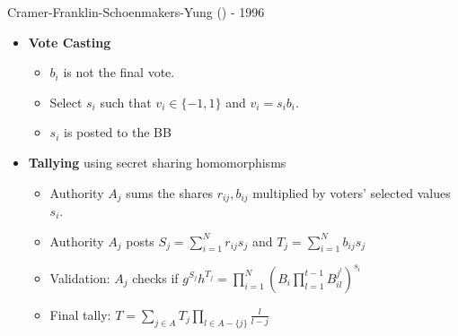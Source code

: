 \documentclass{beamer}
\begin{document}
\begin{frame}[allowframebreaks]{Cramer-Franklin-Schoenmakers-Yung (\cite{CFSY96}) - 1996}
\begin{itemize}
\begin{itemize}
	\framebreak 
	\item Shares $r_i, b_i$ by computing $t-1$ degree polynomials $G_i(x), H_i(x)$ and commits to the 				  			  coefficients  $\{ B_{il} = g^{r_{il}}h^{b_{il}} \}_{l=1}^{t-1}$
	\item The voter posts ($B_i$, validity proof, coefficient commitments) to the bulletin board, making them available to everybody
	\item The shares of $(r_i,b_i)$ $ \{ r_{ij}=G_i(j), b_{ij} = H_i(j) \}_{j=1}^k$ are sent to the $k$ authorities for validation encrypted using their public keys 
	\item Attention: This opens up room for \textit{didn't send/didn't receive} disputes since the BB is not used
	\item Each authority validates the shares they received against information from the BB
	\begin{itemize}
		\item  $g^{r_ij} h^{b_ij} = B_i \prod_{l=1}^{t-1} B_{il}^{j^l} $ where $B_i, \{B_{il} \}_{l=1}^{t-1}$
		\item If everything is ok it holds since: $B_i \prod_{l=1}^{t-1} B_{il}^{j^l} = g^{G_i(j)}h^{H_i(j)}$.
	\end{itemize}	 
\end{itemize}

\framebreak

\item \textbf{Vote Casting}
\begin{itemize}
\item $b_i$ is not the final vote. 
\item Select $s_i$ such that $v_i \in \{ -1, 1 \}$ and  $v_i = s_i b_i$.  
\item $s_i$ is posted to the BB
\end{itemize}
\item \textbf{Tallying} using secret sharing homomorphisms
\begin{itemize}
\item Authority $A_j$ sums the shares $r_{ij}, b_{ij}$ multiplied by voters' selected values $s_i$. 
\item Authority $A_j$ posts $S_j = \sum_{i=1}^N r_{ij}s_j$ and $T_j = \sum_{i=1}^N b_{ij}s_j$   
\item Validation: $A_j$ checks if $g^{S_j}h^{T_j} = \prod_{i=1}^N (B_i \prod_{l=1}^{t-1} B_{il}^{j^l})^{s_i}$
\item Final tally: $T = \sum_{j \in A} T_j \prod_{l \in A-\{j\}} \frac{l}{l-j}$
\end{itemize}
\end{itemize}

\end{frame}
\end{document}
